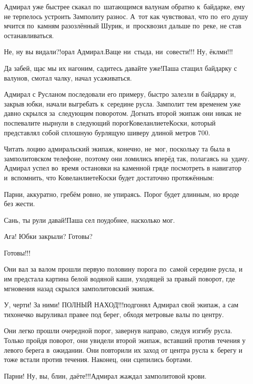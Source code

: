 Адмирал уже быстрее скакал по~шатающимся валунам обратно к~байдарке, ему не терпелось устроить Замполиту разнос. А~тот как чувствовал, что по~его душу мчится по~камням разозлённый Шурик, и~просквозил дальше по~реке, не став останавливаться.

\diagdash Не, ну вы видали?!\mdash орал Адмирал.\mdash Ваще ни~стыда, ни~совести!!! Ну, ёклмн!!!

\diagdash Да забей, щас мы их нагоним, садитесь давайте уже!\mdash Паша стащил байдарку с валунов, смотал чалку, начал усаживаться. 

Адмирал с Русланом последовали его примеру, быстро залезли в байдарку и, закрыв юбки, начали выгребать к~середине русла. Замполит тем временем уже давно скрылся за~следующим поворотом. Догнать второй экипаж они никак не поспевали\mdash те нырнули в следующий порог\mdash Ковеланлиете\sdash Коски, который представлял собой сплошную бурлящую шиверу длиной метров 700.

Читать лоцию адмиральский экипаж, конечно, не~мог, поскольку та была в замполитовском телефоне, поэтому они ломились вперёд так, полагаясь на~удачу. Адмирал успел во~время остановки на каменной гряде посмотреть в навигатор и~вспомнить, что Ковеланлиете\sdash Коски будет достаточно протяжённым:

\diagdash Парни, аккуратно, гребём ровно, не упираясь. Порог будет длинным, но вроде без жести.

\diagdash Сань, ты рули давай!\mdash Паша сел поудобнее, насколько мог.

\diagdash Ага! Юбки закрыли? Готовы?

\diagdash Готовы!!!

Они вал за валом прошли первую половину порога по~самой середине русла, и им предстала картина белой водяной каши, уходящей за правый поворот, где мгновения назад скрылся замполитовский экипаж.

\diagdash У, черти! За ними! {\large ПОЛНЫЙ НАХОД!!!}\mdash подгонял Адмирал свой экипаж, а сам тихонечко выруливал правее под берег, обходя метровые валы по центру. 

Они легко прошли очередной порог, завернув направо, следуя изгибу русла. Только пройдя поворот, они увидели второй экипаж, вставший против течения у левого берега в~ожидании. Они повторили их заход от центра русла к~берегу и тоже встали против течения. Наконец, они сцепились бортами.

\diagdash Парни! Ну, вы, блин, даёте!!!\mdash Адмирал жаждал замполитовой крови.

